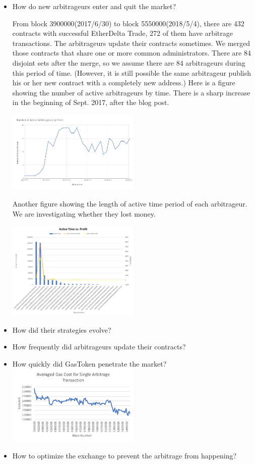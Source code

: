 \documentclass[conference]{IEEEtran}
\begin{document}
\begin{itemize}
    \item How do new arbitrageurs enter and quit the market?
    
    From block 3900000(2017/6/30) to block 5550000(2018/5/4), there are 432 contracts with successful EtherDelta Trade, 272 of them have arbitrage transactions. 
    The arbitrageurs update their contracts sometimes. We merged those contracts that share one or more common administrators. There are 84 disjoint sets after the merge, so we assume there are 84 arbitrageurs during this period of time. (However, it is still possible the same arbitrageur publish his or her new contract with a completely new address.)
    Here is a figure showing the number of active arbitrageurs by time. There is a sharp increase in the beginning of Sept. 2017, after the blog post.
    
    \includegraphics[width=0.5\textwidth]{figures/number_of_active_arbitrageurs_by_time.png}
    
    Another figure showing the length of active time period of each arbitrageur. We are investigating whether they lost money.
    
    
    \includegraphics[width=0.5\textwidth]{figures/active_time_vs_profit.png}
    
    \item How did their strategies evolve?
    
    \item How frequently did arbitrageurs update their contracts? 
    \item How quickly did GasToken penetrate the market?
    \includegraphics[width=0.5\textwidth]{figures/gasused.png}
    \item How to optimize the exchange to prevent the arbitrage from happening?
        

\end{itemize}
\end{document}
